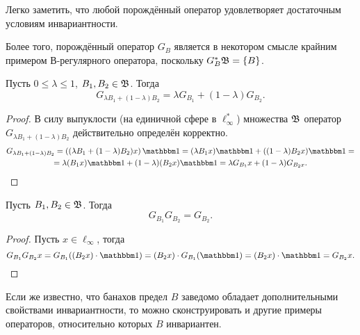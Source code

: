 \begin{remark}
	Легко заметить, что любой порождённый оператор удовлетворяет достаточным условиям инвариантности.
\end{remark}

\begin{remark}
	Более того, порождённый оператор $G_B$ является в некотором смысле крайним примером В-регулярного оператора,
	поскольку $G_B^* \mathfrak{B} = \{B\}$.
\end{remark}

\begin{lemma}
	Пусть $0 \leq \lambda \leq 1$, $B_1, B_2 \in \mathfrak{B}$.
	Тогда
	\begin{equation}
		G_{\lambda B_1+(1-\lambda) B_2} =\lambda G_{B_1} + (1-\lambda)G_{B_2}
		.
	\end{equation}
\end{lemma}


\begin{proof}
	В силу выпуклости (на единичной сфере в $\ell_\infty^*$) множества $\mathfrak{B}$ оператор $G_{\lambda B_1+(1-\lambda) B_2}$
	действительно определён корректно.
	\begin{multline}
		G_{\lambda B_1+(1-\lambda) B_2} =
		\left((\lambda B_1+(1-\lambda) B_2) x\right)\one =
		(\lambda B_1 x) \one +((1-\lambda) B_2 x)\one =
		\\=
		\lambda (B_1 x) \one +(1-\lambda) (B_2 x)\one =
		\lambda G_{B_1} x +(1-\lambda) G_{B_2 x}
		.
	\end{multline}
\end{proof}


\begin{lemma}
	Пусть $B_1, B_2 \in \mathfrak{B}$.
	Тогда
	\begin{equation}
		G_{B_1} G_{B_2} = G_{B_2}
		.
	\end{equation}
\end{lemma}
\begin{proof}
	Пусть $x\in\ell_\infty$, тогда
	\begin{equation}
		G_{B_1}G_{B_2}x =
		G_{B_1} ( (B_2 x) \cdot \one ) =
		(B_2 x) \cdot G_{B_1} ( \one ) =
		(B_2 x) \cdot  \one =
		G_{B_2}x
		.
	\end{equation}
\end{proof}


Если же известно, что банахов предел $B$ заведомо обладает дополнительными свойствами инвариантности,
то можно сконструировать и другие примеры операторов, относительно которых $B$ инвариантен.

